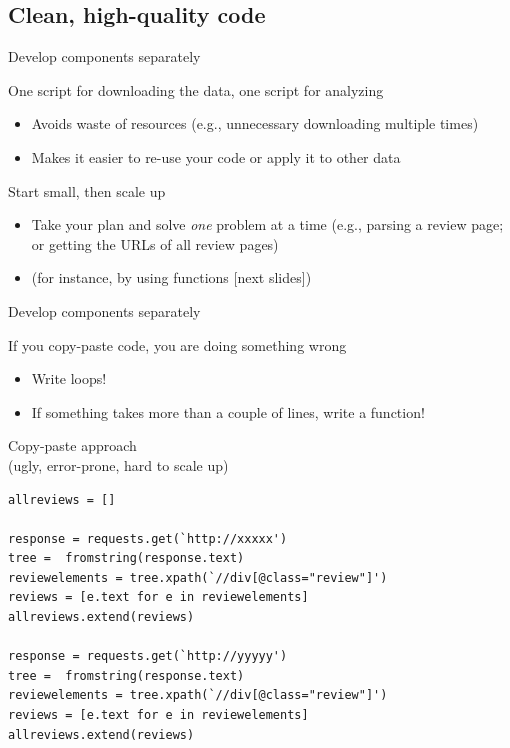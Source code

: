 \documentclass[compress]{beamer}
\begin{document}
\subsection{Clean, high-quality code}
\begin{frame}{Develop components separately}
	\begin{block}{One script for downloading the data, one script for analyzing}
		\begin{itemize}[<+->]
			\item Avoids waste of resources (e.g., unnecessary downloading multiple times)
			\item Makes it easier to re-use your code or apply it to other data
		\end{itemize}
	\end{block}
\pause
\begin{block}{Start small, then scale up}
	\begin{itemize}[<+->]
		\item Take your plan and solve \textit{one} problem at a time (e.g., parsing a review page; or getting the URLs of all review pages)
		\item (for instance, by using functions [next slides])
	\end{itemize}
\end{block}

\end{frame}	

\begin{frame}{Develop components separately}
	\begin{block}{If you copy-paste code, you are doing something wrong}
		\begin{itemize}[<+->]
			\item Write loops!
			\item If something takes more than a couple of lines, write a function!
		\end{itemize}
	\end{block}
\end{frame}

\begin{frame}
Copy-paste approach\\ (ugly, error-prone, hard to scale up)
\begin{lstlisting}
allreviews = []

response = requests.get(`http://xxxxx')
tree =  fromstring(response.text)
reviewelements = tree.xpath(`//div[@class="review"]')
reviews = [e.text for e in reviewelements]
allreviews.extend(reviews)

response = requests.get(`http://yyyyy')
tree =  fromstring(response.text)
reviewelements = tree.xpath(`//div[@class="review"]')
reviews = [e.text for e in reviewelements]
allreviews.extend(reviews)
\end{lstlisting}
\end{frame}
\end{document}
